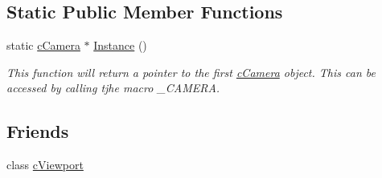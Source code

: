 \subsection*{Static Public Member Functions}
\begin{DoxyCompactItemize}
\item 
\hypertarget{classc_camera_a06efab78c09ce37c375837242719bf58}{
static \hyperlink{classc_camera}{cCamera} $\ast$ \hyperlink{classc_camera_a06efab78c09ce37c375837242719bf58}{Instance} ()}
\label{classc_camera_a06efab78c09ce37c375837242719bf58}

\begin{DoxyCompactList}\small\item\em This function will return a pointer to the first \hyperlink{classc_camera}{cCamera} object. This can be accessed by calling tjhe macro \_\-CAMERA. \end{DoxyCompactList}\end{DoxyCompactItemize}
\subsection*{Friends}
\begin{DoxyCompactItemize}
\item 
\hypertarget{classc_camera_a36b5bd53c16eecf39974e65e00bd408e}{
class \hyperlink{classc_camera_a36b5bd53c16eecf39974e65e00bd408e}{cViewport}}
\label{classc_camera_a36b5bd53c16eecf39974e65e00bd408e}

\end{DoxyCompactItemize}


